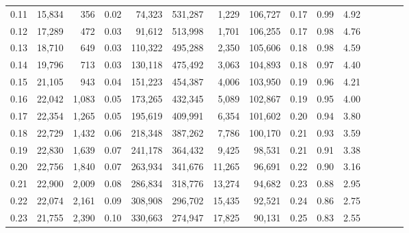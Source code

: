 \begin{tabular}{rrrcrrrrrrrrrrr}
0.11 &  15,834 &    356 &                                       0.02 &   74,323 &  531,287 &    1,229 &  106,727 &  0.17 &  0.99 &                         4.92 \\
0.12 &  17,289 &    472 &                                       0.03 &   91,612 &  513,998 &    1,701 &  106,255 &  0.17 &  0.98 &                         4.76 \\
0.13 &  18,710 &    649 &                                       0.03 &  110,322 &  495,288 &    2,350 &  105,606 &  0.18 &  0.98 &                         4.59 \\
0.14 &  19,796 &    713 &                                       0.03 &  130,118 &  475,492 &    3,063 &  104,893 &  0.18 &  0.97 &                         4.40 \\
0.15 &  21,105 &    943 &                                       0.04 &  151,223 &  454,387 &    4,006 &  103,950 &  0.19 &  0.96 &                         4.21 \\
0.16 &  22,042 &  1,083 &                                       0.05 &  173,265 &  432,345 &    5,089 &  102,867 &  0.19 &  0.95 &                         4.00 \\
0.17 &  22,354 &  1,265 &                                       0.05 &  195,619 &  409,991 &    6,354 &  101,602 &  0.20 &  0.94 &                         3.80 \\
0.18 &  22,729 &  1,432 &                                       0.06 &  218,348 &  387,262 &    7,786 &  100,170 &  0.21 &  0.93 &                         3.59 \\
0.19 &  22,830 &  1,639 &                                       0.07 &  241,178 &  364,432 &    9,425 &   98,531 &  0.21 &  0.91 &                         3.38 \\
0.20 &  22,756 &  1,840 &                                       0.07 &  263,934 &  341,676 &   11,265 &   96,691 &  0.22 &  0.90 &                         3.16 \\
0.21 &  22,900 &  2,009 &                                       0.08 &  286,834 &  318,776 &   13,274 &   94,682 &  0.23 &  0.88 &                         2.95 \\
0.22 &  22,074 &  2,161 &                                       0.09 &  308,908 &  296,702 &   15,435 &   92,521 &  0.24 &  0.86 &                         2.75 \\
0.23 &  21,755 &  2,390 &                                       0.10 &  330,663 &  274,947 &   17,825 &   90,131 &  0.25 &  0.83 &                         2.55 \\

\end{tabular}
